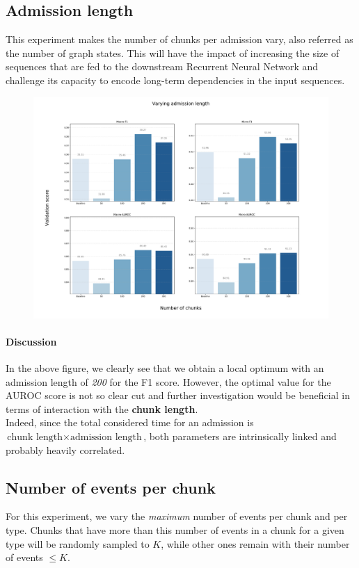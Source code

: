 \newpage
\subsection{Admission length}
This experiment makes the number of chunks per admission vary, also referred as the number of graph states. This will have the impact of increasing the size of sequences that are fed to the downstream Recurrent Neural Network and challenge its capacity to encode long-term dependencies in the input sequences.

\begin{figure}[H]
 \centering
 \includegraphics[width=\textwidth]{figures/exp-chunks.pdf}
\end{figure}

\paragraph{Discussion} In the above figure, we clearly see that we obtain a local optimum with an admission length of \emph{200} for the F1 score. However, the optimal value for the AUROC score is not so clear cut and further investigation would be beneficial in terms of interaction with the \textbf{chunk length}. \\

Indeed, since the total considered time for an admission is $\mbox{chunk length} \times \mbox{admission length}$, both parameters are intrinsically linked and probably heavily correlated.

\newpage
\subsection{Number of events per chunk}
For this experiment, we vary the \textit{maximum} number of events per chunk and per type. Chunks that have more than this number of events in a chunk for a given type will be randomly sampled to $K$, while other ones remain with their number of events $\leq K$.

